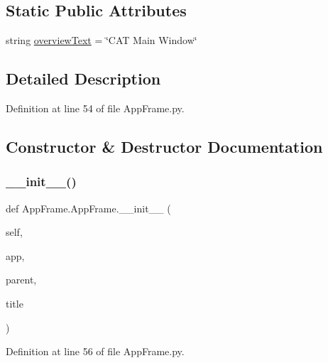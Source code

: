 \subsection*{Static Public Attributes}
\begin{DoxyCompactItemize}
\item 
string \hyperlink{classAppFrame_1_1AppFrame_a4434bdbbdbfdeacb2eaef8fa719140fc}{overview\+Text} = \char`\"{}C\+AT Main Window\char`\"{}
\end{DoxyCompactItemize}


\subsection{Detailed Description}


Definition at line 54 of file App\+Frame.\+py.



\subsection{Constructor \& Destructor Documentation}
\mbox{\label{classAppFrame_1_1AppFrame_a6350576290a782b5e32d3f84ed8ed240}} 
\subsubsection{\texorpdfstring{\+\_\+\+\_\+init\+\_\+\+\_\+()}{\_\_init\_\_()}}
{\footnotesize\ttfamily def App\+Frame.\+App\+Frame.\+\_\+\+\_\+init\+\_\+\+\_\+ (\begin{DoxyParamCaption}\item[{}]{self,  }\item[{}]{app,  }\item[{}]{parent,  }\item[{}]{title }\end{DoxyParamCaption})}



Definition at line 56 of file App\+Frame.\+py.


